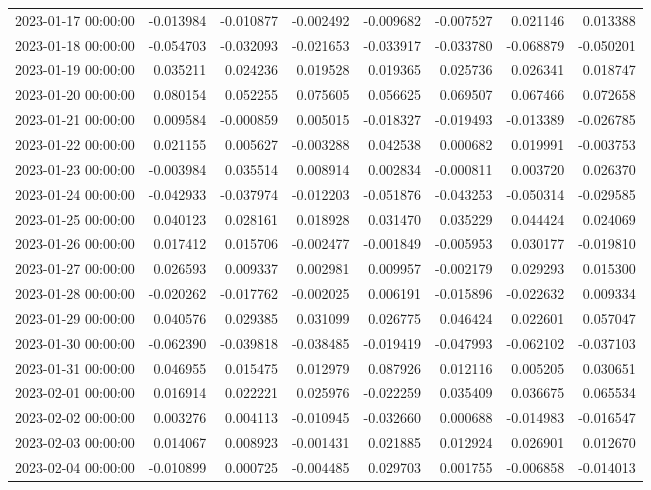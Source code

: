\begin{tabular}{lrrrrrrr}
2023-01-17 00:00:00 & -0.013984 & -0.010877 & -0.002492 & -0.009682 & -0.007527 & 0.021146 & 0.013388 \\
2023-01-18 00:00:00 & -0.054703 & -0.032093 & -0.021653 & -0.033917 & -0.033780 & -0.068879 & -0.050201 \\
2023-01-19 00:00:00 & 0.035211 & 0.024236 & 0.019528 & 0.019365 & 0.025736 & 0.026341 & 0.018747 \\
2023-01-20 00:00:00 & 0.080154 & 0.052255 & 0.075605 & 0.056625 & 0.069507 & 0.067466 & 0.072658 \\
2023-01-21 00:00:00 & 0.009584 & -0.000859 & 0.005015 & -0.018327 & -0.019493 & -0.013389 & -0.026785 \\
2023-01-22 00:00:00 & 0.021155 & 0.005627 & -0.003288 & 0.042538 & 0.000682 & 0.019991 & -0.003753 \\
2023-01-23 00:00:00 & -0.003984 & 0.035514 & 0.008914 & 0.002834 & -0.000811 & 0.003720 & 0.026370 \\
2023-01-24 00:00:00 & -0.042933 & -0.037974 & -0.012203 & -0.051876 & -0.043253 & -0.050314 & -0.029585 \\
2023-01-25 00:00:00 & 0.040123 & 0.028161 & 0.018928 & 0.031470 & 0.035229 & 0.044424 & 0.024069 \\
2023-01-26 00:00:00 & 0.017412 & 0.015706 & -0.002477 & -0.001849 & -0.005953 & 0.030177 & -0.019810 \\
2023-01-27 00:00:00 & 0.026593 & 0.009337 & 0.002981 & 0.009957 & -0.002179 & 0.029293 & 0.015300 \\
2023-01-28 00:00:00 & -0.020262 & -0.017762 & -0.002025 & 0.006191 & -0.015896 & -0.022632 & 0.009334 \\
2023-01-29 00:00:00 & 0.040576 & 0.029385 & 0.031099 & 0.026775 & 0.046424 & 0.022601 & 0.057047 \\
2023-01-30 00:00:00 & -0.062390 & -0.039818 & -0.038485 & -0.019419 & -0.047993 & -0.062102 & -0.037103 \\
2023-01-31 00:00:00 & 0.046955 & 0.015475 & 0.012979 & 0.087926 & 0.012116 & 0.005205 & 0.030651 \\
2023-02-01 00:00:00 & 0.016914 & 0.022221 & 0.025976 & -0.022259 & 0.035409 & 0.036675 & 0.065534 \\
2023-02-02 00:00:00 & 0.003276 & 0.004113 & -0.010945 & -0.032660 & 0.000688 & -0.014983 & -0.016547 \\
2023-02-03 00:00:00 & 0.014067 & 0.008923 & -0.001431 & 0.021885 & 0.012924 & 0.026901 & 0.012670 \\
2023-02-04 00:00:00 & -0.010899 & 0.000725 & -0.004485 & 0.029703 & 0.001755 & -0.006858 & -0.014013 \\

\end{tabular}
